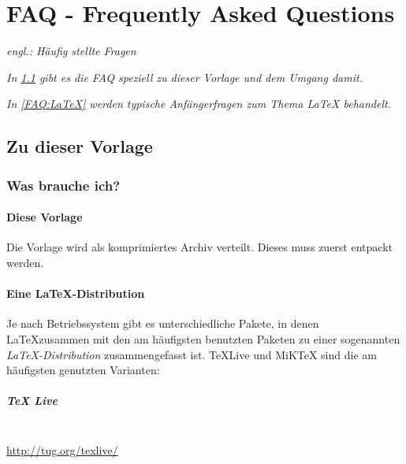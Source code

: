 
\chapter{FAQ - Frequently Asked Questions}
	\label{sec:anhang:faq}
	\emph{engl.: Häufig stellte Fragen}
	
	\emph{In \ref{FAQ:Vorlage} gibt es die FAQ speziell zu dieser Vorlage und dem Umgang damit.}
	
	\emph{In \ref{FAQ:LaTeX} werden typische Anfängerfragen zum Thema \LaTeX{} behandelt.} 
	
	\section{Zu dieser Vorlage}\label{FAQ:Vorlage}
		\subsection{Was brauche ich?}
			\subsubsection{Diese Vorlage}
			Die Vorlage wird als komprimiertes Archiv verteilt. Dieses muss zuerst entpackt werden.
			
			\subsubsection{Eine LaTeX-Distribution}
			Je nach Betriebssystem gibt es unterschiedliche Pakete, in denen \LaTeX zusammen mit den am häufigsten benutzten Paketen zu einer sogenannten \emph{\LaTeX-Distribution} zusammengefasst ist.
%			
			\TeX Live und MiKTeX sind die am häufigsten genutzten Varianten:
			
			\paragraph{TeX Live}~\\
			     
			\hfill
			\url{http://tug.org/texlive/}
			\medskip
			
